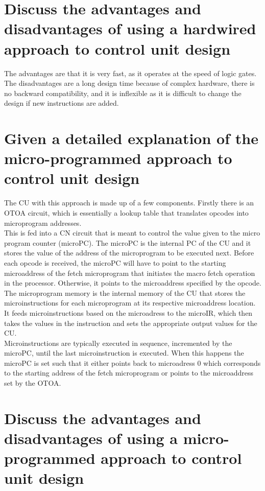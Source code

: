 \documentclass{article}
\begin{document}
\section{Discuss the advantages and disadvantages of using a hardwired approach to control unit design}

The advantages are that it is very fast, as it operates at the speed of logic
gates. \\
The disadvantages are a long design time because of complex hardware, there is
no backward compatibility, and it is inflexible as it is difficult to change the
design if new instructions are added.

\section{Given a detailed explanation of the micro-programmed approach to control unit design}

The CU with this approach is made up of a few components. Firstly there is an
OTOA circuit, which is essentially a lookup table that translates opcodes into
microprogram addresses. \\
This is fed into a CN circuit that is meant to control the value given to the
micro program counter (microPC). The microPC is the internal PC of the CU and it
stores the value of the address of the microprogram to be executed next. Before
each opcode is received, the microPC will have to point to the starting
microaddress of the fetch microprogram that initiates the macro fetch operation
in the processor. Otherwise, it points to the microaddress specified by the
opcode. \\
The microprogram memory is the internal memory of the CU that stores the
microinstructions for each microprogram at its respective microaddress location.
\\
It feeds microinstructions based on the microadress to the microIR, which then
takes the values in the instruction and sets the appropriate output values for
the CU. \\
Microinstructions are typically executed in sequence, incremented by the
microPC, until the last microinstruction is executed. When this happens the
microPC is set such that it either points back to microadress 0 which
corresponds to the starting address of the fetch microprogram or points to the
microaddress set by the OTOA.

\section{Discuss the advantages and disadvantages of using a micro-programmed approach to control unit design}
\end{document}
